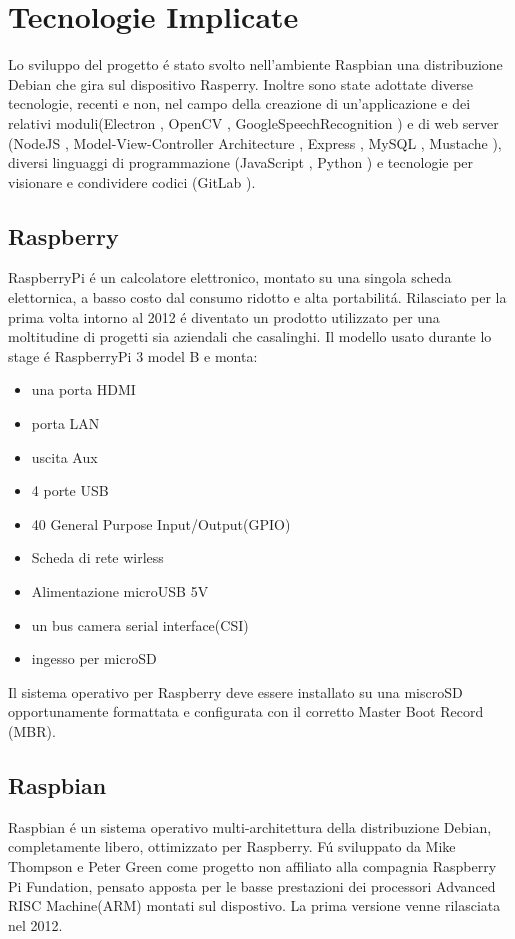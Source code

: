 \chapter{Tecnologie Implicate}

Lo sviluppo del progetto \'e stato svolto nell'ambiente Raspbian\cite{Raspbian}
una distribuzione Debian\cite{Debian} che gira sul dispositivo Rasperry\cite{Raspberry}.
Inoltre sono state adottate diverse tecnologie, recenti
e non, nel campo della creazione di un'applicazione e dei relativi moduli(Electron \cite{Electron-website},
OpenCV \cite{OpenCV-website}, GoogleSpeechRecognition \cite{GoogleSTT-website})
e di web server (NodeJS \cite{NodeJS-website},  Model-View-Controller Architecture \cite{MVC-Architecture},
Express \cite{Express-website}, MySQL \cite{MySQL}, Mustache \cite{Mustache}),
diversi linguaggi di programmazione (JavaScript \cite{JavaScript}, Python \cite{Python})
e tecnologie per visionare e condividere codici (GitLab \cite{git-website}).

\section{Raspberry}
RaspberryPi \'e un calcolatore elettronico, montato su una singola scheda elettornica, a basso costo
dal consumo ridotto e alta portabilit\'a.
Rilasciato per la prima volta intorno al 2012 \'e diventato un prodotto utilizzato per una moltitudine
di progetti sia aziendali che casalinghi.
Il modello usato durante lo stage \'e RaspberryPi 3 model B e monta:
\begin{itemize}
\item una porta HDMI
\item porta LAN
\item uscita Aux
\item 4 porte USB
\item 40 General Purpose Input/Output(GPIO)
\item Scheda di rete wirless
\item Alimentazione microUSB 5V
\item un bus camera serial interface(CSI)
\item ingesso per microSD
\end{itemize}
Il sistema operativo per Raspberry deve essere installato su una miscroSD opportunamente formattata
e configurata con il corretto Master Boot Record (MBR).

\section{Raspbian}
Raspbian \'e un sistema operativo multi-architettura della distribuzione Debian, completamente libero,
ottimizzato per Raspberry.
F\'u sviluppato da Mike Thompson e Peter Green come progetto non affiliato alla compagnia Raspberry Pi
Fundation, pensato apposta per le basse prestazioni dei processori Advanced RISC Machine(ARM) montati sul
dispostivo.
La prima versione venne rilasciata nel 2012.

